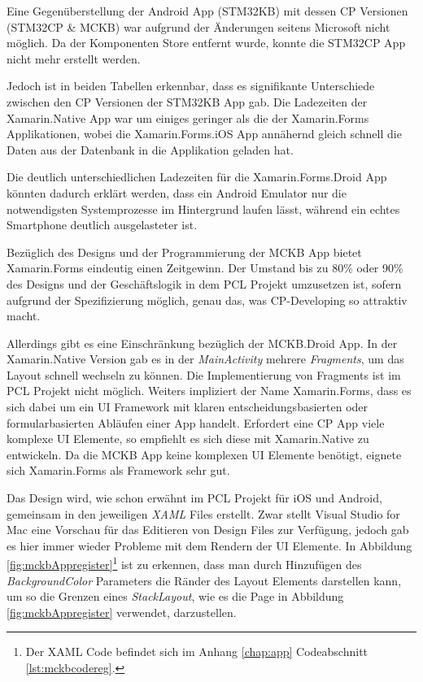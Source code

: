 	Eine Gegenüberstellung der Android App (STM32KB) mit dessen CP Versionen (STM32CP \& MCKB) war aufgrund der Änderungen seitens Microsoft nicht möglich. Da der Komponenten Store entfernt wurde, konnte die STM32CP App nicht mehr erstellt werden.

	Jedoch ist in beiden Tabellen erkennbar, dass es signifikante Unterschiede zwischen den CP Versionen der STM32KB App gab. Die Ladezeiten der Xamarin.Native App war um einiges geringer als die der Xamarin.Forms Applikationen, wobei die Xamarin.Forms.iOS App annähernd gleich schnell die Daten aus der Datenbank in die Applikation geladen hat.

	Die deutlich unterschiedlichen Ladezeiten für die Xamarin.Forms.Droid App könnten dadurch erklärt werden, dass ein Android Emulator nur die notwendigsten Systemprozesse im Hintergrund laufen lässt, während ein echtes Smartphone deutlich ausgelasteter ist.

	Bezüglich des Designs und der Programmierung der MCKB App bietet Xamarin.Forms eindeutig einen Zeitgewinn. Der Umstand bis zu 80\% oder 90\% des Designs und der Geschäftslogik in dem PCL Projekt umzusetzen ist, sofern aufgrund der Spezifizierung möglich, genau das, was CP-Developing so attraktiv macht. 

	Allerdings gibt es eine Einschränkung bezüglich der MCKB.Droid App. In der Xamarin.Native Version gab es in der \textit{MainActivity} mehrere \textit{Fragments}, um das Layout schnell wechseln zu können. Die Implementierung von Fragments ist im PCL Projekt nicht möglich. Weiters impliziert der Name Xamarin.Forms, dass es sich dabei um ein UI Framework mit klaren entscheidungsbasierten oder formularbasierten Abläufen einer App handelt. Erfordert eine CP App viele komplexe UI Elemente, so empfiehlt es sich diese mit Xamarin.Native zu entwickeln. Da die MCKB App keine komplexen UI Elemente benötigt, eignete sich Xamarin.Forms als Framework sehr gut.

	Das Design wird, wie schon erwähnt im PCL Projekt für iOS und Android, gemeinsam in den jeweiligen \textit{XAML} Files erstellt. Zwar stellt Visual Studio for Mac eine Vorschau für das Editieren von Design Files zur Verfügung, jedoch gab es hier immer wieder Probleme mit dem Rendern der UI Elemente. In Abbildung \ref{fig:mckbAppregister}\footnote{Der XAML Code befindet sich im Anhang \ref{chap:app} Codeabschnitt \ref{lst:mckbcodereg}.} ist zu erkennen, dass man durch Hinzufügen des \textit{BackgroundColor} Parameters die Ränder des Layout Elements darstellen kann, um so die Grenzen eines \textit{StackLayout}, wie es die Page in Abbildung \ref{fig:mckbAppregister} verwendet, darzustellen.

